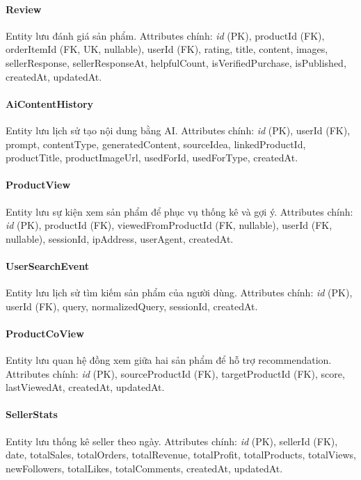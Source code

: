 \paragraph{Review} Entity lưu đánh giá sản phẩm. Attributes chính: \textit{id} (PK), productId (FK), orderItemId (FK, UK, nullable), userId (FK), rating, title, content, images, sellerResponse, sellerResponseAt, helpfulCount, isVerifiedPurchase, isPublished, createdAt, updatedAt.

\paragraph{AiContentHistory} Entity lưu lịch sử tạo nội dung bằng AI. Attributes chính: \textit{id} (PK), userId (FK), prompt, contentType, generatedContent, sourceIdea, linkedProductId, productTitle, productImageUrl, usedForId, usedForType, createdAt.

\paragraph{ProductView} Entity lưu sự kiện xem sản phẩm để phục vụ thống kê và gợi ý. Attributes chính: \textit{id} (PK), productId (FK), viewedFromProductId (FK, nullable), userId (FK, nullable), sessionId, ipAddress, userAgent, createdAt.

\paragraph{UserSearchEvent} Entity lưu lịch sử tìm kiếm sản phẩm của người dùng. Attributes chính: \textit{id} (PK), userId (FK), query, normalizedQuery, sessionId, createdAt.

\paragraph{ProductCoView} Entity lưu quan hệ đồng xem giữa hai sản phẩm để hỗ trợ recommendation. Attributes chính: \textit{id} (PK), sourceProductId (FK), targetProductId (FK), score, lastViewedAt, createdAt, updatedAt.

\paragraph{SellerStats} Entity lưu thống kê seller theo ngày. Attributes chính: \textit{id} (PK), sellerId (FK), date, totalSales, totalOrders, totalRevenue, totalProfit, totalProducts, totalViews, newFollowers, totalLikes, totalComments, createdAt, updatedAt.

